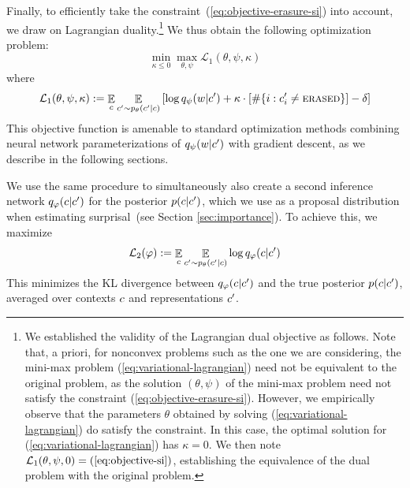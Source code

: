 Finally, to efficiently take the constraint~(\ref{eq:objective-erasure-si}) into account, we draw on Lagrangian duality.\footnote{We established the validity of the Lagrangian dual objective as follows.
Note that, a priori, for nonconvex problems such as the one we are considering, the mini-max problem (\ref{eq:variational-lagrangian}) need not be equivalent to the original problem, as the solution $(\theta,\psi)$ of the mini-max problem need not satisfy the constraint (\ref{eq:objective-erasure-si}).
However, we empirically observe that the parameters $\theta$ obtained by solving (\ref{eq:variational-lagrangian}) do satisfy the constraint.
In this case, the optimal solution for (\ref{eq:variational-lagrangian}) has $\kappa = 0$.
We then note $\mathcal{L}_1(\theta, \psi, 0) = (\ref{eq:objective-si})$, establishing the equivalence of the dual problem with the original problem.
}
We thus obtain the following optimization problem:
\begin{equation}\label{eq:variational-lagrangian}
	\min_{\kappa \leq 0} \max_{\theta, \psi}  \mathcal{L}_1(\theta, \psi, \kappa)
\end{equation}
where
\begin{equation}\label{eq:lagrangian}
	\mathcal{L}_1(\theta, \psi, \kappa) := \mathop{\mathbb{E}}_c \mathop{\mathbb{E}}_{c' \sim p_\theta(c'|c)} \left[ \log q_\psi(w|c') + \kappa \cdot \left[\#\{i : c'_i \neq \text{\textsc{erased}}\}\right] - \delta\right]
\end{equation}
This objective function is amenable to standard optimization methods combining neural network parameterizations of $q_\psi(w|c')$ with gradient descent, as we describe in the following sections.


We use the same procedure to simultaneously also create a second inference network $q_\varphi(c|c')$ for the posterior $p(c|c')$, which we use as a proposal distribution when estimating surprisal~(see Section \ref{sec:importance}).
To achieve this, we maximize
\begin{equation}\label{sec:reconstruction-objective}
	\mathcal{L}_2(\varphi) := \mathop{\mathbb{E}}_c \mathop{\mathbb{E}}_{c' \sim p_\theta(c'|c)} \log q_\varphi(c|c')
\end{equation}
This minimizes the KL divergence between $q_\varphi(c|c')$ and the true posterior $p(c|c')$, averaged over contexts $c$ and representations $c'$.



